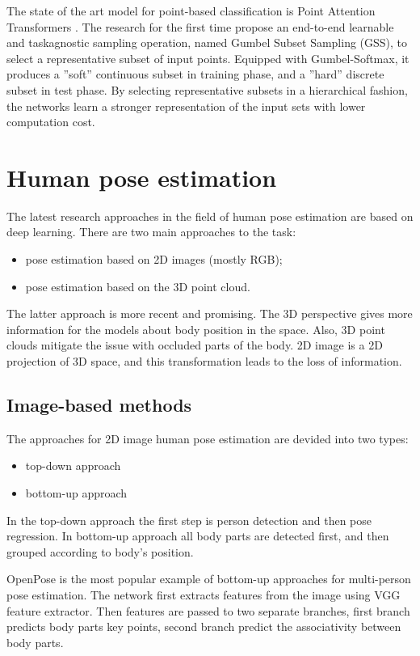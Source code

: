 The state of the art model for point-based classification is Point Attention Transformers \parencite{yang_modeling_2019}. The research for the first time propose an end-to-end learnable and taskagnostic sampling operation, named Gumbel Subset Sampling (GSS), to select a representative subset of input points. Equipped with Gumbel-Softmax, it produces a ”soft” continuous subset in training phase, and a ”hard” discrete subset in test phase. By selecting representative subsets in a hierarchical fashion, the networks learn a stronger representation of the input sets with lower computation cost.

\section{Human pose estimation}
The latest research approaches in the field of human pose estimation are based on deep learning.
There are two main approaches to the task:
\begin{itemize}
  \item pose estimation based on 2D images (mostly RGB);
  \item pose estimation based on the 3D point cloud.
\end{itemize}

The latter approach is more recent and promising. The 3D perspective gives more information for the models about body position in the space. Also, 3D point clouds mitigate the issue with occluded parts of the body. 2D image is a 2D projection of 3D space, and this transformation leads to the loss of information.

\subsection{Image-based methods}
The approaches for 2D image human pose estimation are devided into two types:
\begin{itemize}
  \item top-down approach
  \item bottom-up approach
\end{itemize}
In the top-down approach the first step is person detection and then pose regression. In bottom-up approach all body parts are detected first, and then grouped according to body's position.

OpenPose \parencite{cao_openpose_2019} is the most popular example of bottom-up approaches for multi-person pose estimation. The network first extracts features from the image using VGG feature extractor. Then features are passed to two separate branches, first branch predicts body parts key points, second branch predict the associativity between body parts.

